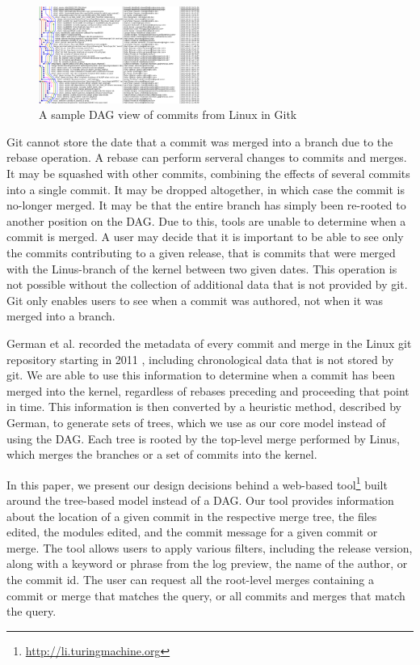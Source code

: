 \documentclass[conference, draftclsnofoot]{IEEEtran}
\begin{document}
\begin{figure}
        \centering
        \includegraphics[width=0.47\textwidth]{figures/gitk.png}
        \caption{A sample DAG view of commits from Linux in Gitk}
        \label{fig:gitk}
\end{figure}

Git cannot store the date that a commit was merged into a branch due to the rebase
operation. A rebase can perform serveral changes to commits and merges. It may be
squashed with other commits, combining the effects of several commits into a single
commit. It may be dropped altogether, in which case the commit is no-longer merged.
It may be that the entire branch has simply been re-rooted to another position on
the DAG. Due to this, tools are unable to determine when a commit is merged. A user
may decide that it is important to be able to see only the commits contributing to a
given release, that is commits that were merged with the Linus-branch of the kernel
between two given dates. This operation is not possible without the collection of
additional data that is not provided by git. Git only enables users to see when a
commit was authored, not when it was merged into a branch.

German et al. recorded the metadata of every commit and merge in the Linux git
repository starting in 2011 \cite{German2015}, including chronological data that is
not stored by git. We are able to use this information to determine when a commit
has been merged into the kernel, regardless of rebases preceding and proceeding that
point in time. This information is then converted by a heuristic method, described
by German, to generate sets of trees, which we use as our core model instead of
using the DAG. Each tree is rooted by the top-level merge performed by Linus, which
merges the branches or a set of commits into the kernel.

In this paper, we present our design decisions behind a web-based
tool\footnote{\url{http://li.turingmachine.org}} built around the tree-based model
instead of a DAG. Our tool provides information about the location of a given commit
in the respective merge tree, the files edited, the modules edited, and the commit
message for a given commit or merge. The tool allows users to apply various filters,
including the release version, along with a keyword or phrase from the log preview,
the name of the author, or the commit id. The user can request all the root-level
merges containing a commit or merge that matches the query, or all commits and
merges that match the query.
\end{document}

